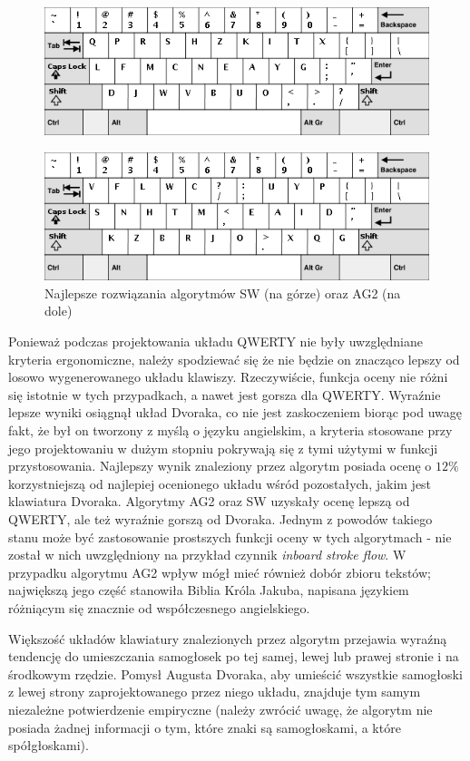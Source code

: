 \documentclass{xmgr}
\begin{document}
\begin{figure}[!tbh]
\centering
\includegraphics[width=.7\hsize]{fig/sw_en}
\end{figure}
\begin{figure}[!tbh]
\centering
\includegraphics[width=.7\hsize]{fig/ag2_en}
\caption{Najlepsze rozwiązania algorytmów SW (na górze) oraz AG2 (na dole)}
\end{figure}

Ponieważ podczas projektowania układu QWERTY nie były uwzględniane kryteria ergonomiczne, należy spodziewać się że nie będzie on znacząco lepszy od losowo wygenerowanego układu klawiszy. Rzeczywiście, funkcja oceny nie różni się istotnie w tych przypadkach, a nawet jest gorsza dla QWERTY. Wyraźnie lepsze wyniki osiągnął układ Dvoraka, co nie jest zaskoczeniem biorąc pod uwagę fakt, że był on tworzony z myślą o języku angielskim, a kryteria stosowane przy jego projektowaniu w dużym stopniu pokrywają się z tymi użytymi w funkcji przystosowania. Najlepszy wynik znaleziony przez algorytm posiada ocenę o $12\%$ korzystniejszą od najlepiej ocenionego układu wśród pozostałych, jakim jest klawiatura Dvoraka. Algorytmy AG2 oraz SW uzyskały ocenę lepszą od QWERTY, ale też wyraźnie gorszą od Dvoraka. Jednym z powodów takiego stanu może być zastosowanie prostszych funkcji oceny w tych algorytmach - nie został w nich uwzględniony na przykład czynnik \emph{inboard stroke flow}. W przypadku algorytmu AG2 wpływ mógł mieć również dobór zbioru tekstów; największą jego część stanowiła Biblia Króla Jakuba, napisana językiem różniącym się znacznie od współczesnego angielskiego.

Większość układów klawiatury znalezionych przez algorytm przejawia wyraźną tendencję do umieszczania samogłosek po tej samej, lewej lub prawej stronie i na środkowym rzędzie. Pomysł Augusta Dvoraka, aby umieścić wszystkie samogłoski z lewej strony zaprojektowanego przez niego układu, znajduje tym samym niezależne potwierdzenie empiryczne (należy zwrócić uwagę, że algorytm nie posiada żadnej informacji o tym, które znaki są samogłoskami, a które spółgłoskami).
\end{document}
